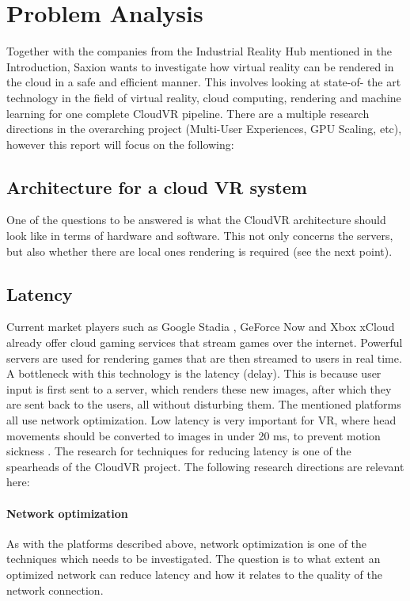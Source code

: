 \section{Problem Analysis}

Together with the companies from the Industrial Reality Hub mentioned in the Introduction, Saxion wants to investigate how virtual reality
can be rendered in the cloud in a safe and efficient manner. This involves looking at state-of-
the art technology in the field of virtual reality, cloud computing, rendering and machine learning for one
complete CloudVR pipeline. There are a multiple research directions in the overarching project (Multi-User Experiences, GPU Scaling, etc), however this report will focus on the following:

\subsection{Architecture for a cloud VR system}
One of the questions to be answered is what the CloudVR architecture should look like
in terms of hardware and software. This not only concerns the servers, but also whether there are local ones
rendering is required (see the next point).

\subsection{Latency}
Current market players such as Google Stadia \parencite{stadia}, GeForce Now \parencite{geforcenow} and Xbox xCloud \parencite{xcloud} already offer cloud gaming services that stream games over the internet. Powerful servers are used for rendering games that are then streamed to users in real time. A bottleneck with this technology is the latency (delay). This is because user input is first sent to a server, which renders these new images, after which they are sent back to the users, all without disturbing them. The mentioned platforms all use network optimization. Low latency is very important for VR, where head movements should be converted to images in under 20 \acrfull{ms}, to prevent motion sickness \parencite{valvevrlatency}. The research for techniques for reducing latency is one of the spearheads of the CloudVR project. The following research directions are relevant here:

\paragraph{Network optimization}
As with the platforms described above, network optimization is one of the techniques
which needs to be investigated. The question is to what extent an optimized network
can reduce latency and how it relates to the quality of the network connection.

